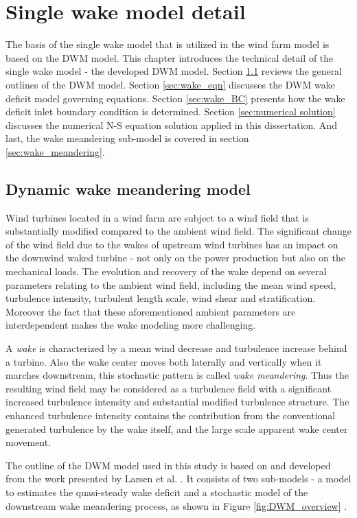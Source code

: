 \documentclass{umthesis}
\begin{document}
\chapter{Single wake model detail} \label{chap:DWM_detail}
The basis of the single wake model that is utilized in the wind farm model is based on the DWM model. This chapter introduces the technical detail of the single wake model - the developed DWM model. Section \ref{sec:DWM_overview} reviews the general outlines of the DWM model. Section \ref{sec:wake_eqn} discusses the DWM wake deficit model governing equations. Section \ref{sec:wake_BC} presents how the wake deficit inlet boundary condition is determined. Section \ref{sec:numerical solution} discusses the numerical N-S equation solution applied in this dissertation. And last, the wake meandering sub-model is covered in section \ref{sec:wake_meandering}.

\section{Dynamic wake meandering model}\label{sec:DWM_overview}
Wind turbines located in a wind farm are subject to a wind field that is substantially modified compared to the ambient wind field. The significant change of the wind field due to the wakes of upstream wind turbines has an impact on the downwind waked turbine - not only on the power production but also on the mechanical loads. The evolution and recovery of the wake depend on several parameters relating to the ambient wind field, including the mean wind speed, turbulence intensity, turbulent length scale, wind shear and stratification. Moreover the fact that these aforementioned ambient parameters are interdependent makes the wake modeling more challenging.

A \textit{wake} is characterized by a mean wind decrease and turbulence increase behind a turbine. Also the wake center moves both laterally and vertically when it marches downstream, this stochastic pattern is called \textit{wake meandering}. Thus the resulting wind field may be considered as a turbulence field with a significant increased turbulence intensity and substantial modified turbulence structure. The enhanced turbulence intensity contains the contribution from the conventional generated turbulence by the wake itself, and the large scale apparent wake center movement.

The outline of the DWM model used in this study is based on and developed from the work presented by Larsen et al. \cite{Larsen_wake}. It consists of two sub-models - a model to estimates the quasi-steady wake deficit and a stochastic model of the downstream wake meandering process, as shown in Figure \ref{fig:DWM_overview} \cite{Keck_mixing}.
\end{document}
